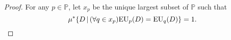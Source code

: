 \documentclass[a4paper]{article}
\newcommand\X{\mathcal{X}}
\renewcommand\P{\mathbb{P}} %
\newcommand\EU{\mathrm{EU}}
\newcommand{\IP}{\P}
\newcommand\SetDelimiter[1][]{
	\nonscript\,#1\vert \allowbreak \nonscript\,\mathopen{}}
\providecommand\given{\SetDelimiter}
\newenvironment{CCM rewritten}
{\begingroup\color{blue}} %
{\endgroup}              %
\begin{document}
\begin{proof}

For any $p\in\IP$, let $x_p$ be the unique largest subset of $\IP$ such that
\[
\mu^*\{D\given (\forall q\in x_p)\EU_p(D)=\EU_q(D)\}=1.
\]


\end{proof}
\end{document}
